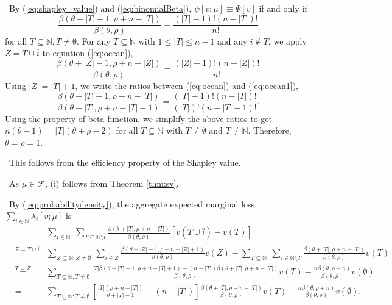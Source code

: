 \documentclass[a4paper,12pt]{article}
\begin{document}
\noindent
{} \
By (\ref{eq:shapley_value}) and (\ref{eq:binomialBeta}), $\psi [v; \mu] \equiv \Psi [v]$ if and only if
\begin{equation}\label{eq:ocean}\tag{A.13}
\frac{\beta(\theta+|T|-1, \rho+n-|T|)}{\beta (\theta, \rho)} = \frac{(|T|-1)!(n-|T|)!}{n!}
\end{equation}
for all $T\subseteq  \mathbb{N}, T\not = \emptyset$. 
For any $T\subseteq \mathbb{N}$ with $1\le |T|\le n-1$ and any $i \not \in T$, we apply  $Z = T\cup \overline{i}$ 
to equation (\ref{eq:ocean}),
\begin{equation}\label{eq:ocean1}\tag{A.14}
\frac{\beta(\theta+|Z|-1, \rho+n-|Z|)}{\beta (\theta, \rho)} = \frac{(|Z|-1)!(n-|Z|)!}{n!}
\end{equation}
Using $|Z|=|T|+1$, we write the ratios between (\ref{eq:ocean}) and (\ref{eq:ocean1}),
$$
\frac{ \beta (\theta+|T|-1, \rho+n-|T|)}{\beta  (\theta+|T|, \rho+n-|T|-1)} 
= \frac{(|T|-1)!(n-|T|)!} {(|T|)!(n-|T|-1)!}.
$$
Using the property of beta function, we simplify the above ratios to get
$
n (\theta-1) = |T| (\theta + \rho -2)
$
for all $T\subseteq \mathbb{N}$ with $T\not = \emptyset$ and $T\not = \mathbb{N}$. 
Therefore,  $\theta=\rho=1$.

\noindent
{} \ This follows from the efficiency property of the Shapley value.

\noindent
{}  \ As $\mu \in \mathscr{F}$, (i) follows from Theorem  \ref{thm:sv}.

\noindent
{} \ By (\ref{eq:probabilitydensity}), 
the aggregate expected marginal loss $\sum\limits_{i\in \mathbb{N}} \lambda_i [v;\mu]$ is
\begin{equation}\label{eq:value_of_unemployed}\tag{A.15}
\begin{array}{rcl}
&&
\sum\limits_{i\in \mathbb{N}}\ \sum\limits_{T\subseteq \mathbb{N}\setminus \overline{i}} 
\frac{\beta(\theta+|T|, \rho+n-|T|)}{\beta(\theta,\rho)}[v(T \cup \overline{i})-v(T)] \\

&\stackrel{Z=T\cup\overline{i}}=&
\sum\limits_{Z\subseteq \mathbb{N}: Z\not = \emptyset}\ \sum\limits_{i\in Z} \frac{\beta(\theta+|Z|-1, \rho+n-|Z|+1)}{\beta(\theta,\rho)}v(Z)
- \sum\limits_{T\subseteq \mathbb{N}}\ \sum\limits_{i\in \mathbb{N}\setminus T} \frac{\beta(\theta+|T|, \rho+n-|T|)}{\beta(\theta,\rho)} v(T) \\

&\stackrel{T=Z}=& \sum\limits_{T\subseteq \mathbb{N}: T\not = \emptyset} 
\frac{|T| \beta(\theta+|T|-1, \rho+n-|T|+1) - (n-|T|)\beta(\theta+|T|, \rho+n-|T|)}{\beta(\theta,\rho)} v(T) 
 - \frac{n\beta(\theta,\rho+n)}{\beta(\theta,\rho)}v(\emptyset)\\

&=& \sum\limits_{T\subseteq \mathbb{N}: T\not = \emptyset} 
\left [ \frac{|T|(\rho+n-|T|)}{\theta+|T|-1} - (n - |T|) \right ]
\frac{\beta(\theta+|T|, \rho+n-|T|)}{\beta(\theta,\rho)} v(T)
- \frac{n\beta(\theta,\rho+n)}{\beta(\theta,\rho)}v(\emptyset).
\end{array}
\end{equation}
\end{document}
